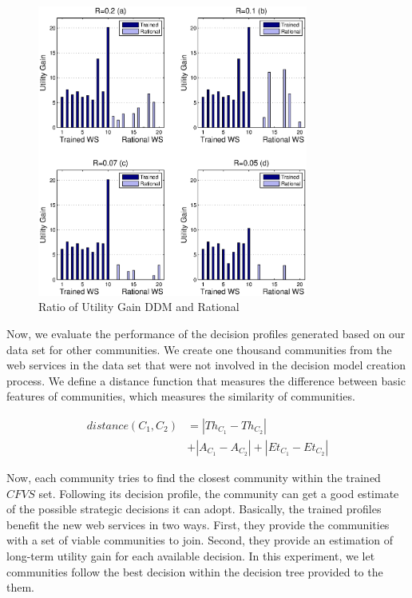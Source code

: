 \documentclass[10pt,journal,cspaper,compsoc]{IEEEtran}
\begin{document}
\begin{figure}%
\centering
\includegraphics[width=3.5in]{figures/utility_ratio.eps}
\caption{Ratio of Utility Gain DDM and Rational}
\label{utility_gain_mlisa_and_rational_ratio}
\end{figure}

Now, we evaluate the performance of the decision profiles generated based on our data set for other communities.%
We create one thousand communities from the web services in the data set that were not involved in the decision model creation process. We define a distance function that measures the difference between basic features of communities, which measures the similarity of communities.

\begin{equation}\label{distance_c}
\begin{split}
distance (C_1, C_2) & = |Th_{C_1} - Th_{C_2}| \\
                    & + |A_{C_1} - A_{C_2}| + |Et_{C_1} - Et_{C_2}|
\end{split}
\end{equation}

Now, each community tries to find the closest community within the trained $CFVS$ set. Following its decision profile, the community can get a good estimate of the possible strategic decisions it can adopt. Basically, the trained profiles benefit the new web services in two ways. First, they provide the communities with a set of viable communities to join. Second, they provide an estimation of long-term utility gain for each available decision. In this experiment, we let communities follow the best decision within the decision tree provided to the them. 
\end{document}
